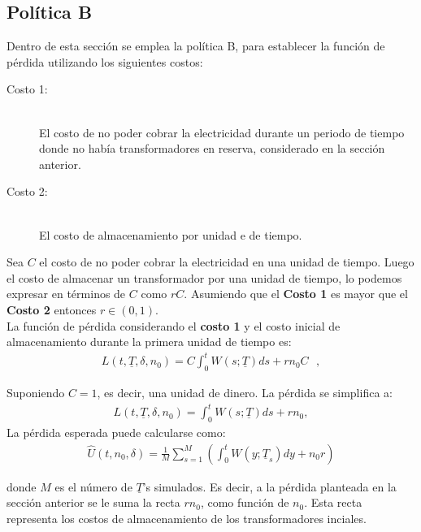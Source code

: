 
\subsection{Pol\'itica B}
\noindent Dentro de esta secci\'on se emplea la pol\'itica B, para establecer la funci\'on de p\'erdida utilizando los siguientes costos:

\begin{description}

\item [Costo 1:] \hfill \\El costo de no poder cobrar la electricidad durante un  periodo de tiempo donde no hab\'ia transformadores en reserva, considerado en la secci\'on anterior.
\item [Costo 2:] \hfill\\El costo de almacenamiento por unidad e de tiempo.
\end{description}

\noindent Sea $C$ el costo de no poder cobrar la electricidad en una unidad de tiempo. Luego el costo de almacenar un transformador por una unidad de tiempo, lo podemos expresar en t\'erminos de $C$ como
 $rC$. Asumiendo que el {\bf Costo 1} es mayor que el {\bf Costo 2} entonces $r \in(0,1)$.\\[0.1cm]
 
 
 
\noindent  La funci\'on de p\'erdida considerando el {\bf costo 1} y el costo inicial de almacenamiento durante la primera unidad de tiempo es:
\begin{eqnarray*}
L(t,\underline{T},\delta, n_0)=C\int_{0}^{t} W(s;\underline{T})  ds + rn_0C \mbox{ },
\end{eqnarray*}

\noindent Suponiendo $C=1$, es decir, una unidad de dinero. La p\'erdida  se simplifica a: 
\begin{eqnarray}\label{LL1}
L(t,\underline{T},\delta, n_0)=\int_{0}^{t} W(s;\underline{T})  ds + rn_0,
\end{eqnarray}
La p\'erdida esperada puede calcularse como:
\begin{eqnarray*}
\hat{U}(t,n_0,\delta)=\frac{1}{M} \sum_{s=1}^{M}\left(\int_{0}^{t} W(y;\underline{T}_s) dy + n_0r\right)
\end{eqnarray*}


 \noindent donde $M$ es el n\'umero de $\underline{T}$'s simulados. Es decir, a la p\'erdida  planteada en la secci\'on anterior se le suma la recta $rn_0$, como funci\'on de $n_0$. Esta recta representa los costos de almacenamiento de los transformadores inciales.

